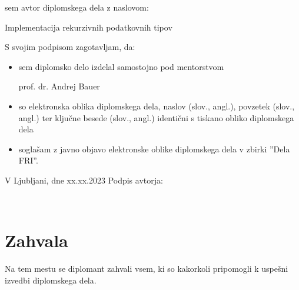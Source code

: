 \documentclass[12pt,a4paper,openany]{book}
\begin{document}
\vspace{1cm}
sem avtor diplomskega dela z naslovom:
   
\vspace{0.5cm}
Implementacija rekurzivnih podatkovnih tipov

\vspace{1.5cm}
S svojim podpisom zagotavljam, da:
\begin{itemize}
	\item sem diplomsko delo izdelal samostojno pod mentorstvom 
	
	prof. dr. Andrej Bauer
	
	\item	so elektronska oblika diplomskega dela, naslov (slov., angl.), povzetek (slov., angl.) ter ključne besede (slov., 			angl.) identični s tiskano obliko diplomskega dela
	\item soglašam z javno objavo elektronske oblike diplomskega dela v zbirki ''Dela FRI''.
\end{itemize}

\vspace{1cm}
V Ljubljani, dne xx.xx.2023 \hspace{1cm} Podpis avtorja:

\newpage 


\ \thispagestyle{empty}

\newpage



\chapter*{Zahvala}

\thispagestyle{empty}

Na tem mestu se diplomant zahvali vsem, ki so kakorkoli pripomogli k uspešni izvedbi diplomskega dela.


\newpage


\ \thispagestyle{empty}

\newpage


\thispagestyle{empty}
\end{document}

